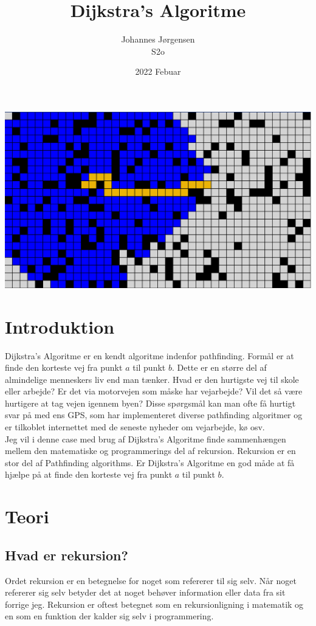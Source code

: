 \documentclass[12pt]{article}
\begin{document}
\title{Dijkstra's Algoritme}
\author{Johannes Jørgensen\\ S2o}
\date{2022 Febuar}
\maketitle
\includegraphics[width=\textwidth]{viz3.png}

\pagebreak
\tableofcontents
\pagebreak

\section{Introduktion}
Dijkstra's Algoritme er en kendt algoritme indenfor pathfinding. Formål er at finde den korteste vej fra punkt $a$ til punkt $b$. Dette er en større del af almindelige menneskers liv end man tænker. Hvad er den hurtigste vej til skole eller arbejde? Er det via motorvejen som måske har vejarbejde? Vil det så være hurtigere at tag vejen igennem byen? Disse spørgsmål kan man ofte få hurtigt svar på med ens GPS, som har implementeret diverse pathfinding algoritmer og er tilkoblet internettet med de seneste nyheder om vejarbejde, kø osv. 
\\Jeg vil i denne case med brug af Dijkstra's Algoritme finde sammenhængen mellem den matematiske og programmerings del af rekursion. Rekursion er en stor del af Pathfinding algorithms. Er Dijkstra's Algoritme en god måde at få hjælpe på at finde den korteste vej fra punkt $a$ til punkt $b$.
\section{Teori}

\subsection{Hvad er rekursion?}
Ordet rekursion er en betegnelse for noget som refererer til sig selv. Når noget refererer sig selv betyder det at noget behøver information eller data fra sit forrige jeg. 
Rekursion er oftest betegnet som en rekursionligning i matematik og en som en funktion der kalder sig selv i programmering. 
\end{document}
